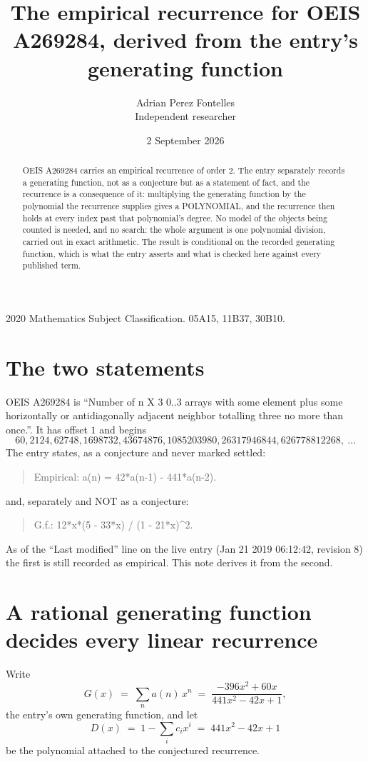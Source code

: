 \documentclass[11pt,a4paper]{article}
\title{The empirical recurrence for OEIS A269284, derived from the entry's generating function}
\author{Adrian Perez Fontelles\\ \small Independent researcher}
\date{2 September 2026}
\theoremstyle{plain}
\theoremstyle{definition}
\begin{document}
\maketitle

\begin{abstract}
OEIS A269284 carries an empirical recurrence of order $2$. The entry separately records a
generating function, not as a conjecture but as a statement of fact, and the recurrence is a
consequence of it: multiplying the generating function by the polynomial the recurrence
supplies gives a POLYNOMIAL, and the recurrence then holds at every index past that
polynomial's degree. No model of the objects being counted is needed, and no search: the
whole argument is one polynomial division, carried out in exact arithmetic. The result is
conditional on the recorded generating function, which is what the entry asserts and what is
checked here against every published term.
\end{abstract}

\noindent\small 2020 Mathematics Subject Classification. 05A15, 11B37, 30B10.\normalsize

\section{The two statements}

OEIS A269284 is ``Number of n X 3 0..3 arrays with some element plus some horizontally or antidiagonally adjacent neighbor totalling three no more than once.''. It has offset $1$ and begins
\[
60, 2124, 62748, 1698732, 43674876, 1085203980, 26317946844, 626778812268,\ \dots
\]
The entry states, as a conjecture and never marked settled:
\begin{quote}
Empirical: a(n) = 42*a(n-1) - 441*a(n-2).
\end{quote}
and, separately and NOT as a conjecture:
\begin{quote}
G.f.: 12*x*(5 - 33*x) / (1 - 21*x)\^{}2.
\end{quote}
As of the ``Last modified'' line on the live entry (Jan 21 2019 06:12:42, revision 8) the first is still
recorded as empirical. This note derives it from the second.

\section{A rational generating function decides every linear recurrence}

Write
\[
G(x)\;=\;\sum_{n}a(n)\,x^{n}\;=\;\frac{- 396 x^{2} + 60 x}{441 x^{2} - 42 x + 1},
\]
the entry's own generating function, and let
\[
D(x)\;=\;1-\sum_i c_i x^{i}\;=\;441 x^{2} - 42 x + 1
\]
be the polynomial attached to the conjectured recurrence.
\end{document}
